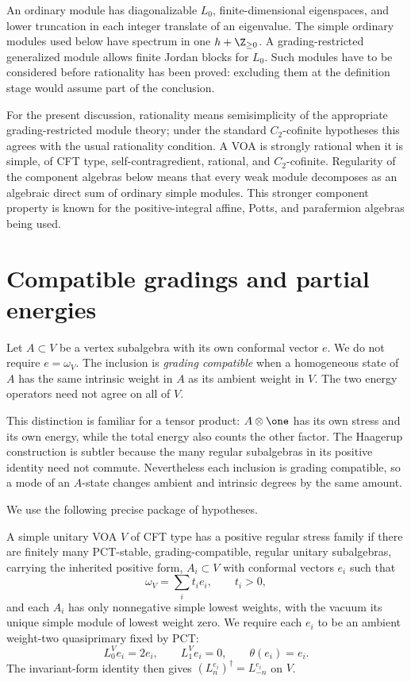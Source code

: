 An ordinary module has diagonalizable $L_0$, finite-dimensional
eigenspaces, and lower truncation in each integer translate of an
eigenvalue. The simple ordinary modules used below have spectrum in
one $h+\Z_{\geq0}$. A grading-restricted generalized module
allows finite Jordan blocks for $L_0$. Such modules have to be
considered before rationality has been proved: excluding them at the
definition stage would assume part of the conclusion.

For the present discussion, rationality means semisimplicity of the
appropriate grading-restricted module theory; under the standard
$C_2$-cofinite hypotheses this agrees with the usual rationality
condition. A VOA is strongly rational when it is simple, of CFT type,
self-contragredient, rational, and $C_2$-cofinite. Regularity of the
component algebras below means that every weak module decomposes as
an algebraic direct sum of ordinary simple modules. This stronger
component property is known for the positive-integral affine,
Potts, and parafermion algebras being used.

\section{Compatible gradings and partial energies}

Let $A\subset V$ be a vertex subalgebra with its own conformal vector
$e$. We do not require $e=\omega_V$. The inclusion is
\emph{grading compatible} when a homogeneous state of $A$ has the
same intrinsic weight in $A$ as its ambient weight in $V$.
The two energy operators need not agree on all of $V$.

This distinction is familiar for a tensor product: $A\otimes\one$
has its own stress and its own energy, while the total energy also
counts the other factor. The Haagerup construction is subtler because
the many regular subalgebras in its positive identity need not commute.
Nevertheless each inclusion is grading compatible, so a mode of an
$A$-state changes ambient and intrinsic degrees by the same amount.

We use the following precise package of hypotheses.

\begin{definition}
A simple unitary VOA $V$ of CFT type has a positive regular stress
family if there are finitely many PCT-stable, grading-compatible, regular
unitary subalgebras, carrying the inherited positive form,
$A_i\subset V$ with conformal vectors $e_i$ such that
\begin{equation}\label{eq:c-regular-positive}
 \omega_V=\sum_i t_i e_i,\qquad t_i>0,
\end{equation}
and each $A_i$ has only nonnegative simple lowest weights, with the
vacuum its unique simple module of lowest weight zero. We require
each $e_i$ to be an ambient weight-two quasiprimary fixed by
PCT:
\[
 L^V_0e_i=2e_i,\qquad L^V_1e_i=0,\qquad\theta(e_i)=e_i.
\]
The invariant-form identity then gives
$(L^{e_i}_n)^\dagger=L^{e_i}_{-n}$ on $V$.
\end{definition}

